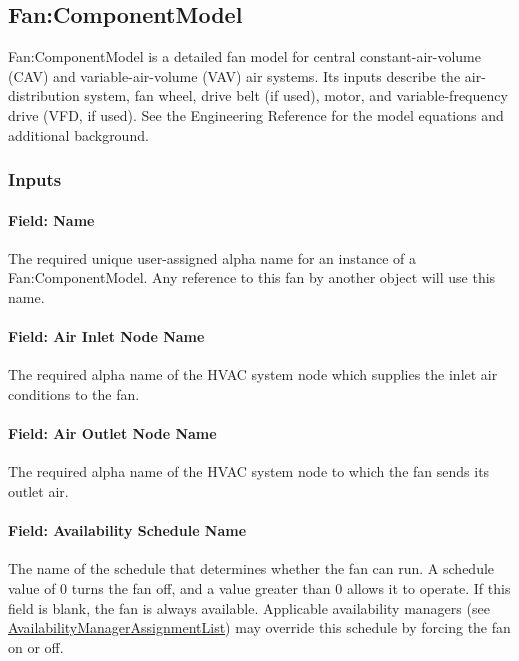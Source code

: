 \subsection{Fan:ComponentModel}\label{fancomponentmodel}

Fan:ComponentModel is a detailed fan model for central constant-air-volume (CAV) and variable-air-volume (VAV) air systems. Its inputs describe the air-distribution system, fan wheel, drive belt (if used), motor, and variable-frequency drive (VFD, if used). See the Engineering Reference for the model equations and additional background.

\subsubsection{Inputs}\label{inputs-5-011}

\paragraph{Field: Name}\label{field-name-4-011}

The required unique user-assigned alpha name for an instance of a Fan:ComponentModel. Any reference to this fan by another object will use this name.

\paragraph{Field: Air Inlet Node Name}\label{field-air-inlet-node-name-4-000}

The required alpha name of the HVAC system node which supplies the inlet air conditions to the fan.

\paragraph{Field: Air Outlet Node Name}\label{field-air-outlet-node-name-4-000}

The required alpha name of the HVAC system node to which the fan sends its outlet air.

\paragraph{Field: Availability Schedule Name}\label{field-availability-schedule-name-4-002}

The name of the schedule that determines whether the fan can run. A schedule value of 0 turns the fan off, and a value greater than 0 allows it to operate. If this field is blank, the fan is always available. Applicable availability managers (see \hyperref[availabilitymanagerassignmentlist]{AvailabilityManagerAssignmentList}) may override this schedule by forcing the fan on or off.

